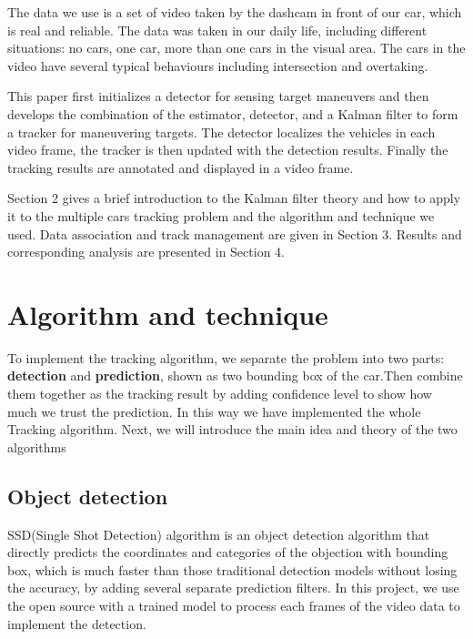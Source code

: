 \documentclass[10pt,twocolumn,letterpaper]{article}
\begin{document}
The data we use is a set of video taken by the dashcam in front of our car, which is real and reliable. The data was taken in our daily life, including different situations: no cars, one car, more than one cars in the visual area. The cars in the video have several typical behaviours including intersection and overtaking.

This paper first initializes a detector for sensing target maneuvers and then develops the combination of the estimator, detector, and a Kalman filter to form a tracker for maneuvering targets. The detector localizes the vehicles in each video frame, the tracker is then updated with the detection results. Finally the tracking results are annotated and displayed in a video frame.

Section 2 gives a brief introduction to the Kalman filter theory
and how to apply it to the multiple cars tracking problem and the algorithm and technique we used.
Data association and track management are given
in Section 3. Results and corresponding analysis are presented in Section 4.

\section{Algorithm and technique}

To implement the tracking algorithm, we separate the problem into two parts: \textbf{detection} and \textbf{prediction}, shown as two bounding box of the car.Then combine them together as the tracking result by adding confidence level to show how much we trust the prediction. In this way we have implemented the whole Tracking algorithm. Next, we will introduce the main idea and theory of the two algorithms

\subsection{Object detection}

SSD(Single Shot Detection) algorithm is an object detection algorithm that directly predicts the coordinates and categories of the objection with bounding box, which is much faster than those traditional detection models without losing the accuracy, by adding several separate prediction filters. In this project, we use the open source with a trained model to process each frames of the video data to implement the detection.
\end{document}
